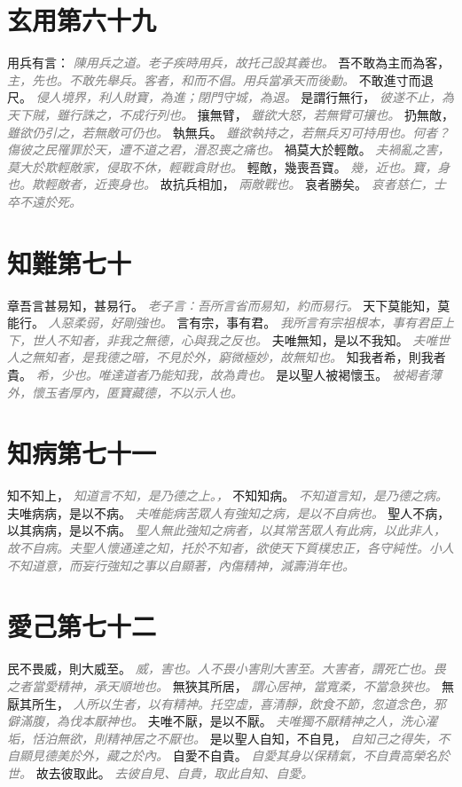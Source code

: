 \documentclass[a4paper,zihao=-4,oneside,landscape,UTF8]{ctexart}
\newcommand{\zhushi}[1]{\scriptsize{\textit{\textcolor{gray}{#1}}}\normalsize}
\begin{document}
\section{玄用第六十九}

用兵有言：
\zhushi{陳用兵之道。老子疾時用兵，故托己設其義也。}
吾不敢為主而為客，
\zhushi{主，先也。不敢先舉兵。客者，和而不倡。用兵當承天而後動。}
不敢進寸而退尺。
\zhushi{侵人境界，利人財寶，為進；閉門守城，為退。}
是謂行無行，
\zhushi{彼遂不止，為天下賊，雖行誅之，不成行列也。}
攘無臂，
\zhushi{雖欲大怒，若無臂可攘也。}
扔無敵，
\zhushi{雖欲仍引之，若無敵可仍也。}
執無兵。
\zhushi{雖欲執持之，若無兵刃可持用也。何者？傷彼之民罹罪於天，遭不道之君，湣忍喪之痛也。}
禍莫大於輕敵。
\zhushi{夫禍亂之害，莫大於欺輕敵家，侵取不休，輕戰貪財也。}
輕敵，幾喪吾寶。
\zhushi{幾，近也。寶，身也。欺輕敵者，近喪身也。}
故抗兵相加，
\zhushi{兩敵戰也。}
哀者勝矣。
\zhushi{哀者慈仁，士卒不遠於死。}


\section{知難第七十}

章吾言甚易知，甚易行。
\zhushi{老子言：吾所言省而易知，約而易行。}
天下莫能知，莫能行。
\zhushi{人惡柔弱，好剛強也。}
言有宗，事有君。
\zhushi{我所言有宗祖根本，事有君臣上下，世人不知者，非我之無德，心與我之反也。}
夫唯無知，是以不我知。
\zhushi{夫唯世人之無知者，是我德之暗，不見於外，窮微極妙，故無知也。}
知我者希，則我者貴。
\zhushi{希，少也。唯達道者乃能知我，故為貴也。}
是以聖人被褐懷玉。
\zhushi{被褐者薄外，懷玉者厚內，匿寶藏德，不以示人也。}


\section{知病第七十一}

知不知上，
\zhushi{知道言不知，是乃德之上。，}
不知知病。
\zhushi{不知道言知，是乃德之病。}
夫唯病病，是以不病。
\zhushi{夫唯能病苦眾人有強知之病，是以不自病也。}
聖人不病，以其病病，是以不病。
\zhushi{聖人無此強知之病者，以其常苦眾人有此病，以此非人，故不自病。夫聖人懷通達之知，托於不知者，欲使天下質樸忠正，各守純性。小人不知道意，而妄行強知之事以自顯著，內傷精神，減壽消年也。}


\section{愛己第七十二}

民不畏威，則大威至。
\zhushi{威，害也。人不畏小害則大害至。大害者，謂死亡也。畏之者當愛精神，承天順地也。}
無狹其所居，
\zhushi{謂心居神，當寬柔，不當急狹也。}
無厭其所生，
\zhushi{人所以生者，以有精神。托空虛，喜清靜，飲食不節，忽道念色，邪僻滿腹，為伐本厭神也。}
夫唯不厭，是以不厭。
\zhushi{夫唯獨不厭精神之人，洗心濯垢，恬泊無欲，則精神居之不厭也。}
是以聖人自知，不自見，
\zhushi{自知己之得失，不自顯見德美於外，藏之於內。}
自愛不自貴。
\zhushi{自愛其身以保精氣，不自貴高榮名於世。}
故去彼取此。
\zhushi{去彼自見、自貴，取此自知、自愛。}
\end{document}
